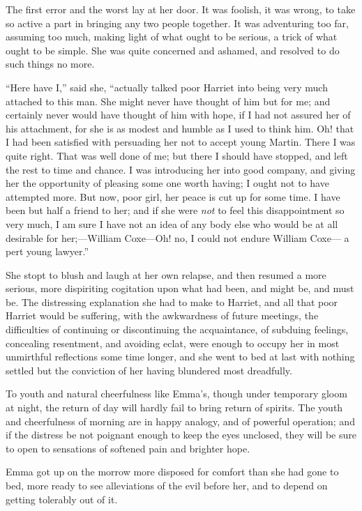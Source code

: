 The first error and the worst lay at her door.  It was foolish,
it was wrong, to take so active a part in bringing any two
people together.  It was adventuring too far, assuming too much,
making light of what ought to be serious, a trick of what ought
to be simple.  She was quite concerned and ashamed, and resolved
to do such things no more.

``Here have I,'' said she, ``actually talked poor Harriet into being
very much attached to this man.  She might never have thought of him
but for me; and certainly never would have thought of him with hope,
if I had not assured her of his attachment, for she is as modest
and humble as I used to think him.  Oh! that I had been satisfied with
persuading her not to accept young Martin.  There I was quite right.
That was well done of me; but there I should have stopped, and left
the rest to time and chance.  I was introducing her into good company,
and giving her the opportunity of pleasing some one worth having;
I ought not to have attempted more.  But now, poor girl, her peace
is cut up for some time.  I have been but half a friend to her;
and if she were \emph{not} to feel this disappointment so very much, I am
sure I have not an idea of any body else who would be at all desirable
for her;---William Coxe---Oh! no, I could not endure William Coxe---%
a pert young lawyer.''

She stopt to blush and laugh at her own relapse, and then resumed
a more serious, more dispiriting cogitation upon what had been,
and might be, and must be.  The distressing explanation she had
to make to Harriet, and all that poor Harriet would be suffering,
with the awkwardness of future meetings, the difficulties of
continuing or discontinuing the acquaintance, of subduing feelings,
concealing resentment, and avoiding eclat, were enough to occupy
her in most unmirthful reflections some time longer, and she went
to bed at last with nothing settled but the conviction of her having
blundered most dreadfully.

To youth and natural cheerfulness like Emma's, though under
temporary gloom at night, the return of day will hardly fail
to bring return of spirits.  The youth and cheerfulness of morning
are in happy analogy, and of powerful operation; and if the
distress be not poignant enough to keep the eyes unclosed, they
will be sure to open to sensations of softened pain and brighter hope.

Emma got up on the morrow more disposed for comfort than she had
gone to bed, more ready to see alleviations of the evil before her,
and to depend on getting tolerably out of it.

